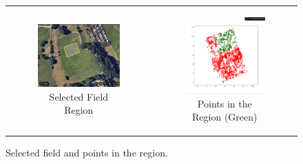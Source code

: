 \begin{figure}[H]
    \centering
    \begin{tabular}{cc} 
        \begin{subfigure}{0.4\textwidth}
            \centering
            \includegraphics[width=\textwidth]{Images/real_robot/field_with_region.png}
            \caption{Selected Field Region}
        \end{subfigure} 
        &
        \begin{subfigure}{0.4\textwidth}
            \centering
            \includegraphics[width=\textwidth]{Images/real_robot/field_region_points.png}
            \caption{Points in the Region (Green)}
        \end{subfigure}
    \end{tabular}
    \caption{Selected field and points in the region.\label{fig:field_region}} 
\end{figure}


